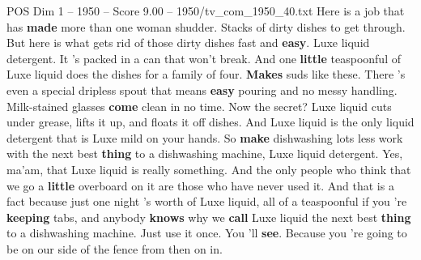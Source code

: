 \begin{textsample}{POS Dim 1 – 1950 – Score 9.00 – 1950/tv\_com\_1950\_40.txt}  \label{ex:f1_pos_011}
Here is a job that has \textbf{made} more than one woman shudder.
Stacks of dirty dishes to get through.
But here is what gets rid of those dirty dishes fast and \textbf{easy}.
Luxe liquid detergent.
It 's packed in a can that won't break.
And one \textbf{little} teaspoonful of Luxe liquid does the dishes for a family of four. \textbf{Makes} suds like these.
There 's even a special dripless spout that means \textbf{easy} pouring and no messy handling.
Milk-stained glasses \textbf{come} clean in no time.
Now the secret?
Luxe liquid cuts under grease, lifts it up, and floats it off dishes.
And Luxe liquid is the only liquid detergent that is Luxe mild on your hands.
So \textbf{make} dishwashing lots less work with the next best \textbf{thing} to a dishwashing machine, Luxe liquid detergent.
Yes, ma'am, that Luxe liquid is really something.
And the only people who think that we go a \textbf{little} overboard on it are those who have never used it.
And that is a fact because just one night 's worth of Luxe liquid, all of a teaspoonful if you 're \textbf{keeping} tabs, and anybody \textbf{knows} why we \textbf{call} Luxe liquid the next best \textbf{thing} to a dishwashing machine.
Just use it once.
You 'll \textbf{see}.
Because you 're going to be on our side of the fence from then on in.

\end{textsample}
